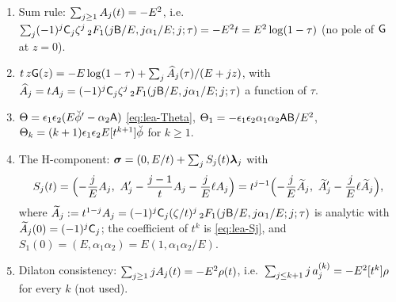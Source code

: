\begin{cor}
\label{cor:lea-sumrule}
\begin{enumerate}
\item[(a)] Sum rule: $\sum_{j\geq 1}A_j(t) = -E^2$, i.e.\ $\sum_j(-1)^j\mathsf{C}_j\zeta^j\,{}_2F_1(j\mathsf{B}/E,j\alpha_1/E;j;\tau) = -E^2t = E^2\log(1-\tau)$ (no pole of $\mathsf{G}$ at $z = 0$).
\item[(b)] $t\,z\mathsf{G}(z) = -E\log(1-\tau) + \sum_j\widehat{A}_j(\tau)/(E+jz)$, with $\widehat{A}_j = tA_j = (-1)^j\mathsf{C}_j\zeta^j\,{}_2F_1(j\mathsf{B}/E,j\alpha_1/E;j;\tau)$ a function of $\tau$.
\item[(c)] $\Theta = \epsilon_1\epsilon_2(E\breve{\phi}' - \alpha_2\mathsf{A})$ \eqref{eq:lea-Theta}, $\Theta_1 = -\epsilon_1\epsilon_2\alpha_1\alpha_2\mathsf{A}\mathsf{B}/E^2$, $\Theta_k = (k+1)\epsilon_1\epsilon_2E[t^{k+1}]\breve{\phi}$ for $k\geq 1$.
\item[(d)] The H-component: $\boldsymbol{\sigma} = (0,E/t) + \sum_jS_j(t)\boldsymbol{\lambda}_j$ with
\[
S_j(t) = \Bigl(-\frac{j}{E}A_j,\ A_j' - \frac{j-1}{t}A_j - \frac{j}{E}\ell A_j\Bigr) = t^{j-1}\Bigl(-\frac{j}{E}\widetilde{A}_j,\ \widetilde{A}_j' - \frac{j}{E}\ell\widetilde{A}_j\Bigr),
\]
where $\widetilde{A}_j := t^{1-j}A_j = (-1)^j\mathsf{C}_j(\zeta/t)^j\,{}_2F_1(j\mathsf{B}/E,j\alpha_1/E;j;\tau)$ is analytic with $\widetilde{A}_j(0) = (-1)^j\mathsf{C}_j$; the coefficient of $t^k$ is \eqref{eq:lea-Sj}, and $S_1(0) = (E,\alpha_1\alpha_2) = E(1,\alpha_1\alpha_2/E)$.
\item[(e)] Dilaton consistency: $\sum_{j\geq 1}jA_j(t) = -E^2\rho(t)$, i.e.\ $\sum_{j\leq k+1}j\,a_j^{(k)} = -E^2[t^k]\rho$ for every $k$ (not used).
\end{enumerate}
\end{cor}

